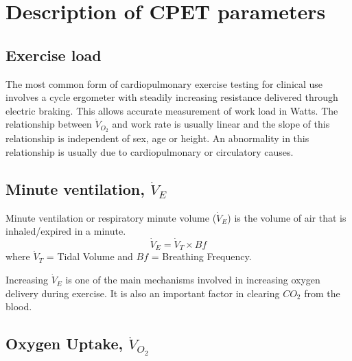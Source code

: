 \section{Description of CPET parameters}
\label{sec:cpx_parameters}


\subsection{Exercise load}
The most common form of cardiopulmonary exercise testing for clinical use involves a cycle ergometer with steadily increasing resistance delivered through electric braking. 
This allows accurate measurement of work load in Watts. 
The relationship between $\dot{V}_{O_2}$ and work rate is usually linear and the slope of this relationship is independent of sex, age or height. 
An abnormality in this relationship is usually due to cardiopulmonary or circulatory causes.

\subsection[Minute ventilation]{Minute ventilation, $\dot{V}_E$}
Minute ventilation or respiratory minute volume ($\dot{V}_E$) is the volume of air that is inhaled/expired in a minute.
\begin{equation} \label{eq:VE=VTxBf}
	\dot{V}_E = \dot{V}_T \times Bf
\end{equation}
where $\dot{V}_T$ = Tidal Volume and $Bf$ = Breathing Frequency.

Increasing $\dot{V}_E$ is one of the main mechanisms involved in increasing oxygen delivery during exercise. 
It is also an important factor in clearing $CO_2$ from the blood.

\subsection[Oxygen Uptake]{Oxygen Uptake, $\dot{V}_{O_2}$}

